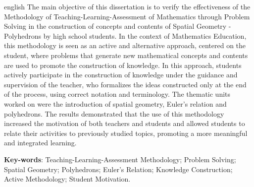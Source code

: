 
\begin{resumo}[Abstract]
	\begin{otherlanguage*}{english}
		The main objective of this dissertation is to verify the effectiveness of the Methodology of Teaching-Learning-Assessment of Mathematics through Problem Solving in the construction of concepts and contents of Spatial Geometry - Polyhedrons by high school students. In the context of Mathematics Education, this methodology is seen as an active and alternative approach, centered on the student, where problems that generate new mathematical concepts and contents are used to promote the construction of knowledge. In this approach, students actively participate in the construction of knowledge under the guidance and supervision of the teacher, who formalizes the ideas constructed only at the end of the process, using correct notation and terminology. The thematic units worked on were the introduction of spatial geometry, Euler's relation and polyhedrons. The results demonstrated that the use of this methodology increased the motivation of both teachers and students and allowed students to relate their activities to previously studied topics, promoting a more meaningful and integrated learning.

		\vspace{\onelineskip}

		\noindent
		\textbf{Key-words}: Teaching-Learning-Assessment Methodology; Problem Solving; Spatial Geometry; Polyhedrons; Euler's Relation; Knowledge Construction; Active Methodology; Student Motivation.
	\end{otherlanguage*}
\end{resumo}
